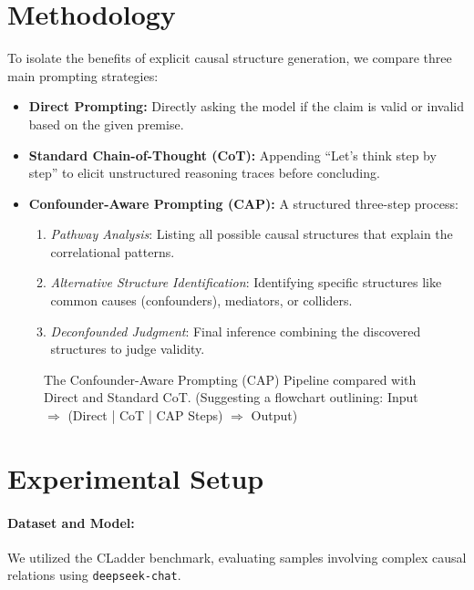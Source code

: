 \documentclass{article}
\theoremstyle{plain}
\theoremstyle{definition}
\theoremstyle{remark}
\begin{document}
\section{Methodology}

To isolate the benefits of explicit causal structure generation, we compare three main prompting strategies:

\begin{itemize}
    \item \textbf{Direct Prompting:} Directly asking the model if the claim is valid or invalid based on the given premise.
    \item \textbf{Standard Chain-of-Thought (CoT):} Appending ``Let's think step by step'' to elicit unstructured reasoning traces before concluding.
    \item \textbf{Confounder-Aware Prompting (CAP):} A structured three-step process:
    \begin{enumerate}
        \item \textit{Pathway Analysis}: Listing all possible causal structures that explain the correlational patterns.
        \item \textit{Alternative Structure Identification}: Identifying specific structures like common causes (confounders), mediators, or colliders.
        \item \textit{Deconfounded Judgment}: Final inference combining the discovered structures to judge validity.
    \end{enumerate}
\end{itemize}

\begin{figure}[ht]
  \vskip 0.2in
  \begin{center}
    \vspace{4cm} %
    \caption{The Confounder-Aware Prompting (CAP) Pipeline compared with Direct and Standard CoT. (Suggesting a flowchart outlining: Input $\Rightarrow$ (Direct | CoT | CAP Steps) $\Rightarrow$ Output)}
    \label{fig:pipeline}
  \end{center}
  \vskip -0.2in
\end{figure}

\section{Experimental Setup}

\paragraph{Dataset and Model:} We utilized the CLadder benchmark, evaluating samples involving complex causal relations using \texttt{deepseek-chat}.
\end{document}
